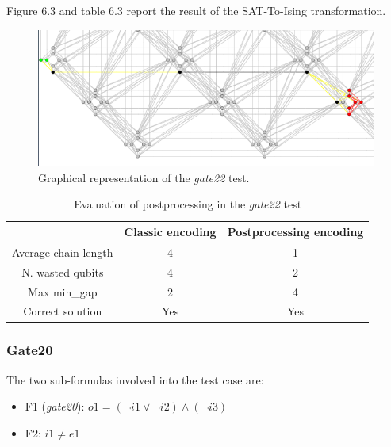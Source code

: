 Figure 6.3 and table 6.3 report the result of the SAT-To-Ising transformation.

\begin{figure}[hbt!]
    \centering
    \includegraphics[width=1.0\textwidth]{images/gate22.PNG}
    \caption{Graphical representation of the \textit{gate22} test.}
    \label{fig:my_label}
\end{figure}

\begin{table}[!hbt]
\centering
\begin{tabular}{|c|c|c|}
\hline
 & \cellcolor[HTML]{FFFE65}Classic encoding & \cellcolor[HTML]{FFFE65}Postprocessing encoding \\ \hline
\cellcolor[HTML]{00D2CB}Average chain length & 4 & 1 \\ \hline
\cellcolor[HTML]{00D2CB}N. wasted qubits & 4 & 2 \\ \hline
\cellcolor[HTML]{00D2CB}Max min\_gap & 2 & 4 \\ \hline
\rowcolor[HTML]{67FD9A} 
\cellcolor[HTML]{00D2CB}Correct solution     & Yes                                      & Yes                                             \\ \hline
\end{tabular}
\caption{Evaluation of postprocessing in the \textit{gate22} test}
\end{table}

\newpage

\subsubsection{Gate20}

The two sub-formulas involved into the test case are:

\begin{itemize}
    \item F1 (\textit{gate20}): $o1 = (\neg i1 \vee \neg i2) \wedge (\neg i3)$
    \item F2: $i1 \neq e1$
\end{itemize}


